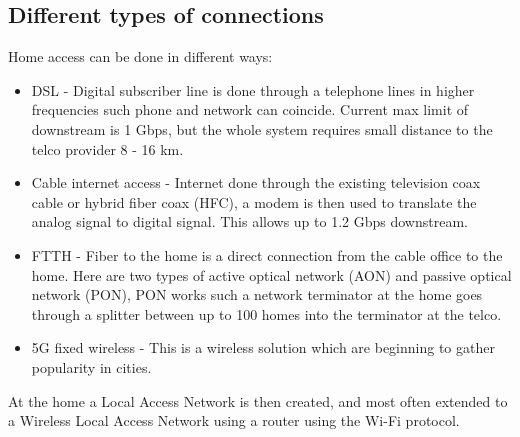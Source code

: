 \documentclass[12pt, a4paper]{article}
\begin{document}
		\subsection{Different types of connections}
			Home access can be done in different ways:
			\begin{itemize}
				\item DSL - Digital subscriber line is done through a telephone lines in higher frequencies such phone and network can coincide. Current max limit of downstream is 1 Gbps, but the whole system requires small distance to the telco provider 8 - 16 km.
				\item Cable internet access - Internet done through the existing television coax cable or hybrid fiber coax (HFC), a modem is then used to translate the analog signal to digital signal. This allows up to 1.2 Gbps downstream. 
				\item FTTH - Fiber to the home is a direct connection from the cable office to the home. Here are two types of active optical network (AON) and passive optical network (PON), PON works such a network terminator at the home goes through a splitter between up to 100 homes into the terminator at the telco.\\
				\item 5G fixed wireless - This is a wireless solution which are beginning to gather popularity in cities.
			\end{itemize}
			At the home a Local Access Network is then created, and most often extended to a Wireless Local Access Network using a router using the Wi-Fi protocol.
\end{document}
